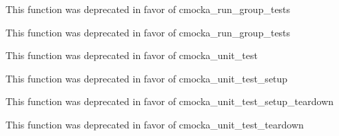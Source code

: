 
\begin{DoxyRefList}
\item[\label{deprecated__deprecated000004}%
\Hypertarget{deprecated__deprecated000004}%
Member \hyperlink{group__cmocka__exec_ga246dbcbb338e4becbfef009b2bb14b78}{group\+\_\+test\+\_\+setup} (setup)]This function was deprecated in favor of cmocka\+\_\+run\+\_\+group\+\_\+tests  
\item[\label{deprecated__deprecated000005}%
\Hypertarget{deprecated__deprecated000005}%
Member \hyperlink{group__cmocka__exec_ga03159d4169e85cb92bb0eba97cfcf18d}{group\+\_\+test\+\_\+teardown} (teardown)]This function was deprecated in favor of cmocka\+\_\+run\+\_\+group\+\_\+tests  
\item[\label{deprecated__deprecated000001}%
\Hypertarget{deprecated__deprecated000001}%
Member \hyperlink{group__cmocka__exec_gaf79fe61343efe7cdeb5bbb12a5577cb3}{unit\+\_\+test} (f)]This function was deprecated in favor of cmocka\+\_\+unit\+\_\+test  
\item[\label{deprecated__deprecated000002}%
\Hypertarget{deprecated__deprecated000002}%
Member \hyperlink{group__cmocka__exec_gaf005639a9b71cced47ce4708e53912d9}{unit\+\_\+test\+\_\+setup} (test, setup)]This function was deprecated in favor of cmocka\+\_\+unit\+\_\+test\+\_\+setup  
\item[\label{deprecated__deprecated000006}%
\Hypertarget{deprecated__deprecated000006}%
Member \hyperlink{group__cmocka__exec_gaee80106db018434c00df4ba235415b26}{unit\+\_\+test\+\_\+setup\+\_\+teardown} (test, setup, teardown)]This function was deprecated in favor of cmocka\+\_\+unit\+\_\+test\+\_\+setup\+\_\+teardown  
\item[\label{deprecated__deprecated000003}%
\Hypertarget{deprecated__deprecated000003}%
Member \hyperlink{group__cmocka__exec_ga3fe0f3c69fb85843701876937b7217f4}{unit\+\_\+test\+\_\+teardown} (test, teardown)]This function was deprecated in favor of cmocka\+\_\+unit\+\_\+test\+\_\+teardown 
\end{DoxyRefList}